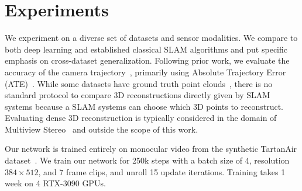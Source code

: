 \documentclass{article}
\begin{document}
\section{Experiments}
\vspace{-1mm}
We experiment on a diverse set of datasets and sensor modalities. We compare to both deep learning and established classical SLAM algorithms and put specific emphasis on cross-dataset generalization. Following prior work, we evaluate the accuracy of the camera trajectory~\cite{orbslam,dso,badslam}, primarily using Absolute Trajectory Error (ATE)~\cite{tumrgbd}.
While some datasets have ground truth point clouds~\cite{tanks}, there is no standard protocol to compare 3D reconstructions directly given by SLAM systems because a SLAM systems can choose which 3D points to reconstruct. Evaluating dense 3D reconstruction is typically considered in the domain of Multiview Stereo~\cite{mvs} and outside the scope of this work.

Our network is trained entirely on monocular video from the synthetic TartanAir dataset~\cite{tartanair}. We train our network for 250k steps with a batch size of 4, resolution $384\times512$, and 7 frame clips, and unroll 15 update iterations. Training takes 1 week on 4 RTX-3090 GPUs.


\begin{table}[h]
\end{table}
\end{document}
